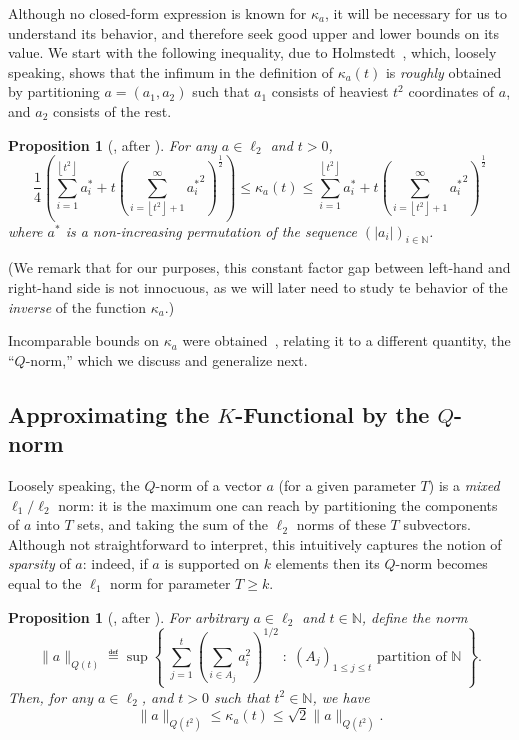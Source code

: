 \documentclass[11pt]{article}
\newtheorem{proposition}[prop]{Proposition}
\theoremstyle{remark}   	\newtheorem{remark}[theorem]{Remark}
\theoremstyle{definition}   	\newaliascnt{defn}{theorem}
\newcommand{\setOfSuchThat}[2]{ \left\{\; #1 \;\colon\; #2\; \right\} } 			\newcommand{\indicSet}[1]{\mathds{1}_{#1}}                                              \newcommand{\indic}[1]{\indicSet{\left\{#1\right\}}}                                             \newcommand{\disjunion}{\amalg}
\newcommand{\norm}[1]{\lVert#1{\rVert}}
\newcommand{\abs}[1]{\left\lvert #1 \right\rvert}
\newcommand{\flr}[1]{\left\lfloor #1 \right\rfloor}
\newcommand{\N}{\ensuremath{\mathbb{N}}\xspace}
\newcommand{\lp}[1][1]{\ell_{#1}}
\newcommand{\kf}[1]{\kappa_{#1}}
\begin{document}
Although no closed-form expression is known for $\kf{a}$, it will be necessary for us to understand its behavior, and therefore seek good upper and lower bounds on its value. We start with the following inequality, due to Holmstedt~\cite{Holm:70}, which, loosely speaking, shows that the infimum in the definition of $\kf{a}(t)$ is \emph{roughly} obtained by partitioning $a = (a_1,a_2)$ such that $a_1$ consists of heaviest $t^2$ coordinates of $a$, and $a_2$ consists of the rest.
\begin{proposition}[{\cite[Proposition 2.2]{Astashkin:2010}}, after {\cite[Theorem 4.2]{Holm:70}}]\label{theo:bounds:kf}
For any $a\in\lp[2]$ and $t > 0$,
  \begin{equation}
    \frac{1}{4}\left( \sum_{i=1}^{\flr{t^2}} a^\ast_i + t\left( \sum_{i=\flr{t^2}+1}^\infty {a^\ast_i}^2 \right)^{\frac{1}{2}} \right)
    \leq \kf{a}(t)
    \leq \sum_{i=1}^{\flr{t^2}} a^\ast_i + t\left( \sum_{i=\flr{t^2}+1}^\infty {a^\ast_i}^2 \right)^{\frac{1}{2}}
  \end{equation}
where $a^\ast$ is a non-increasing permutation of the sequence $(\abs{a_i})_{i\in\N}$.
\end{proposition}
\noindent (We remark that for our purposes, this constant factor gap between left-hand and right-hand side is not innocuous, as we will later need to study te behavior of the \emph{inverse} of the function $\kf{a}$.)\medskip

Incomparable bounds on $\kf{a}$ were obtained~\cite{MS:90}, relating it to a different quantity, the ``$Q$-norm,'' which we discuss and generalize next.

\subsection{Approximating the $K$-Functional by the $Q$-norm}
 Loosely speaking, the $Q$-norm of a vector $a$ (for a given parameter $T$) is a \emph{mixed} $\lp[1]/\lp[2]$ norm: it is the maximum one can reach by partitioning the components of $a$ into $T$ sets, and taking the sum of the $\lp[2]$ norms of these $T$ subvectors. Although not straightforward to interpret, this intuitively captures the notion of \emph{sparsity} of $a$: indeed, if $a$ is supported on $k$ elements then its $Q$-norm becomes equal to the $\lp[1]$ norm for parameter $T\geq k$.

\begin{proposition}[{\cite[Lemma 2.2]{Astashkin:2010}}, after {\cite[Lemma 2]{MS:90}}]\label{prop:qnorm:kf}
  For arbitrary $a\in\lp[2]$ and $t\in\N$, define the norm
  \[
    \norm{a}_{Q(t)} \eqdef \sup \setOfSuchThat{ \sum_{j=1}^t \left( \sum_{i\in A_j} a_i^2 \right)^{1/2} }{ (A_j)_{1\leq j\leq t} \text{ partition of } \N }.
  \]
  Then, for any $a\in\lp[2]$, and $t>0$ such that $t^2\in\N$, we have
  \begin{equation}\label{eq:qnorm:kf:orig}
    \norm{a}_{Q(t^2)} \leq \kf{a}(t) \leq \sqrt{2}\norm{a}_{Q(t^2)}.
  \end{equation}
\end{proposition}
\end{document}
